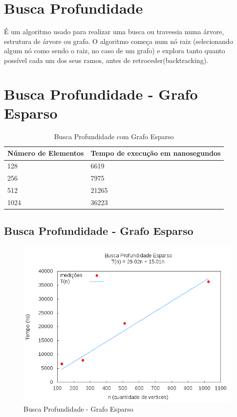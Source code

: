 \documentclass[12pt,a4paper,twoside]{report}
\begin{document}
\section{Busca Profundidade}
É um algoritmo usado para realizar uma busca ou travessia numa árvore, estrutura de árvore ou grafo. O algoritmo começa num nó raiz (selecionando algum nó como sendo o raiz, no caso de um grafo) e explora tanto quanto possível cada um dos seus ramos, antes de retroceder(backtracking).

\section{Busca Profundidade - Grafo Esparso}
\begin{table}[H]
\centering
\caption{Busca Profundidade com Grafo Esparso}
\label{my-label}
\begin{tabular}{|l|l|}
\hline
\multicolumn{1}{|c|}{\textbf{Número de Elementos}} & \multicolumn{1}{c|}{\textbf{Tempo de execução em nanosegundos}} \\ \hline
128 & 6619 \\ \hline
256 & 7975 \\ \hline
512 & 21265 \\ \hline
1024 & 36223 \\ \hline
\end{tabular}
\end{table}

\subsection{Busca Profundidade - Grafo Esparso}
\begin{figure}[H]
    \centering
    \includegraphics[width=0.7\linewidth]{graficos/BuscaProfundidade/Esparso/Esparso.png}
  \caption{Busca Profundidade - Grafo Esparso}
\end{figure}
\end{document}
